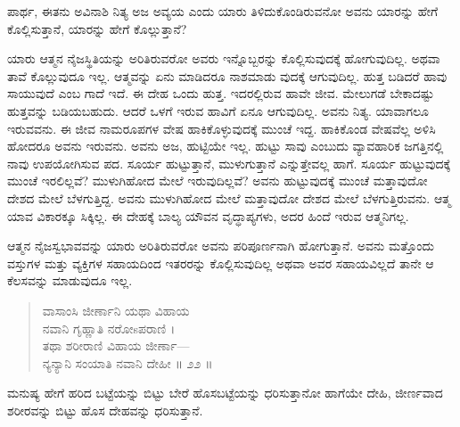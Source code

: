 {\small ಪಾರ್ಥ, ಈತನು ಅವಿನಾಶಿ ನಿತ್ಯ ಅಜ ಅವ್ಯಯ ಎಂದು ಯಾರು ತಿಳಿದುಕೊಂಡಿರುವನೋ ಅವನು ಯಾರನ್ನು ಹೇಗೆ ಕೊಲ್ಲಿಸುತ್ತಾನೆ, ಯಾರನ್ನು ಹೇಗೆ ಕೊಲ್ಲುತ್ತಾನೆ?}

ಯಾರು ಆತ್ಮನ ನೈಜಸ್ಥಿತಿಯನ್ನು ಅರಿತಿರುವರೋ ಅವರು ಇನ್ನೊಬ್ಬರನ್ನು ಕೊಲ್ಲಿಸುವುದಕ್ಕೆ ಹೋಗುವುದಿಲ್ಲ. ಅಥವಾ ತಾವೆ ಕೊಲ್ಲುವುದೂ ಇಲ್ಲ. ಆತ್ಮವನ್ನು ಏನು ಮಾಡಿದರೂ ನಾಶಮಾಡು ವುದಕ್ಕೆ ಆಗುವುದಿಲ್ಲ. ಹುತ್ತ ಬಡಿದರೆ ಹಾವು ಸಾಯುವುದೆ ಎಂಬ ಗಾದೆ ಇದೆ. ಈ ದೇಹ ಒಂದು ಹುತ್ತ. ಇದರಲ್ಲಿರುವ ಹಾವೇ ಜೀವ. ಮೇಲುಗಡೆ ಬೇಕಾದಷ್ಟು ಹುತ್ತವನ್ನು ಬಡಿಯಬಹುದು. ಆದರೆ ಒಳಗೆ ಇರುವ ಹಾವಿಗೆ ಏನೂ ಆಗುವುದಿಲ್ಲ. ಅವನು ನಿತ್ಯ. ಯಾವಾಗಲೂ ಇರುವವನು. ಈ ಜೀವ ನಾಮರೂಪಗಳ ವೇಷ ಹಾಕಿಕೊಳ್ಳುವುದಕ್ಕೆ ಮುಂಚೆ ಇದ್ದ. ಹಾಕಿಕೊಂಡ ವೇಷವೆಲ್ಲ ಅಳಿಸಿ ಹೋದರೂ ಅವನು ಇರುವನು. ಅವನು ಅಜ, ಹುಟ್ಟಿಯೇ ಇಲ್ಲ. ಹುಟ್ಟು ಸಾವು ಎಂಬುದು ವ್ಯಾವಹಾರಿಕ ಜಗತ್ತಿನಲ್ಲಿ ನಾವು ಉಪಯೋಗಿಸುವ ಪದ. ಸೂರ್ಯ ಹುಟ್ಟುತ್ತಾನೆ, ಮುಳುಗುತ್ತಾನೆ ಎನ್ನುತ್ತೇವಲ್ಲ ಹಾಗೆ. ಸೂರ್ಯ ಹುಟ್ಟುವುದಕ್ಕೆ ಮುಂಚೆ ಇರಲಿಲ್ಲವೆ? ಮುಳುಗಿಹೋದ ಮೇಲೆ ಇರುವುದಿಲ್ಲವೆ? ಅವನು ಹುಟ್ಟುವುದಕ್ಕೆ ಮುಂಚೆ ಮತ್ತಾವುದೋ ದೇಶದ ಮೇಲೆ ಬೆಳಗುತ್ತಿದ್ದ. ಅವನು ಮುಳುಗಿಹೋದ ಮೇಲೆ ಮತ್ತಾವುದೋ ದೇಶದ ಮೇಲೆ ಬೆಳಗುತ್ತಿರುವನು. ಆತ್ಮ ಯಾವ ವಿಕಾರಕ್ಕೂ ಸಿಕ್ಕಿಲ್ಲ. ಈ ದೇಹಕ್ಕೆ ಬಾಲ್ಯ ಯೌವನ ವೃದ್ಧಾಪ್ಯಗಳು, ಅದರ ಹಿಂದೆ ಇರುವ ಆತ್ಮನಿಗಲ್ಲ.

ಆತ್ಮನ ನೈಜಸ್ವಭಾವವನ್ನು ಯಾರು ಅರಿತಿರುವರೋ ಅವನು ಪರಿಪೂರ್ಣನಾಗಿ ಹೋಗುತ್ತಾನೆ. ಅವನು ಮತ್ತೊಂದು ವಸ್ತುಗಳ ಮತ್ತು ವ್ಯಕ್ತಿಗಳ ಸಹಾಯದಿಂದ ಇತರರನ್ನು ಕೊಲ್ಲಿಸುವುದಿಲ್ಲ ಅಥವಾ ಅವರ ಸಹಾಯವಿಲ್ಲದೆ ತಾನೇ ಆ ಕೆಲಸವನ್ನು ಮಾಡುವುದೂ ಇಲ್ಲ.

\begin{verse}
ವಾಸಾಂಸಿ ಜೀರ್ಣಾನಿ ಯಥಾ ವಿಹಾಯ\\ನವಾನಿ ಗೃಹ್ಣಾತಿ ನರೋsಪರಾಣಿ ।\\ತಥಾ ಶರೀರಾಣಿ ವಿಹಾಯ ಜೀರ್ಣಾ—\\ನ್ಯನ್ಯಾನಿ ಸಂಯಾತಿ ನವಾನಿ ದೇಹೀ \num{॥ ೨೨ ॥}
\end{verse}

{\small ಮನುಷ್ಯ ಹೇಗೆ ಹರಿದ ಬಟ್ಟೆಯನ್ನು ಬಿಟ್ಟು ಬೇರೆ ಹೊಸಬಟ್ಟೆಯನ್ನು ಧರಿಸುತ್ತಾನೋ ಹಾಗೆಯೇ ದೇಹಿ, ಜೀರ್ಣವಾದ ಶರೀರವನ್ನು ಬಿಟ್ಟು ಹೊಸ ದೇಹವನ್ನು ಧರಿಸುತ್ತಾನೆ.}


